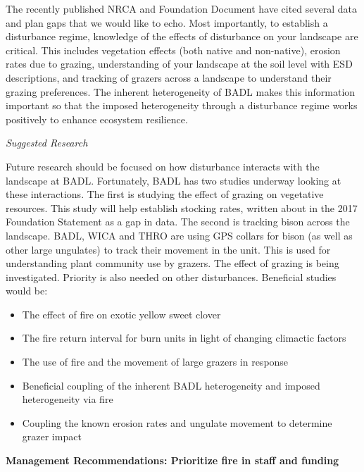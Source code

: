 The recently published NRCA and Foundation Document have cited several
data and plan gaps that we would like to echo. Most importantly, to
establish a disturbance regime, knowledge of the effects of disturbance
on your landscape are critical. This includes vegetation effects (both
native and non-native), erosion rates due to grazing, understanding of
your landscape at the soil level with ESD descriptions, and tracking of
grazers across a landscape to understand their grazing preferences. The
inherent heterogeneity of BADL makes this information important so that
the imposed heterogeneity through a disturbance regime works positively
to enhance ecosystem resilience.

\emph{Suggested Research}

Future research should be focused on how disturbance interacts with the
landscape at BADL. Fortunately, BADL has two studies underway looking at
these interactions. The first is studying the effect of grazing on
vegetative resources. This study will help establish stocking rates,
written about in the 2017 Foundation Statement as a gap in data. The
second is tracking bison across the landscape. BADL, WICA and THRO are
using GPS collars for bison (as well as other large ungulates) to track
their movement in the unit. This is used for understanding plant
community use by grazers. The effect of grazing is being investigated.
Priority is also needed on other disturbances. Beneficial studies would
be:

\begin{itemize}
\item
  The effect of fire on exotic yellow sweet clover
\item
  The fire return interval for burn units in light of changing climactic
  factors
\item
  The use of fire and the movement of large grazers in response
\item
  Beneficial coupling of the inherent BADL heterogeneity and imposed
  heterogeneity via fire
\item
  Coupling the known erosion rates and ungulate movement to determine
  grazer impact
\end{itemize}

\textbf{Management Recommendations: Prioritize fire in staff and funding
}

